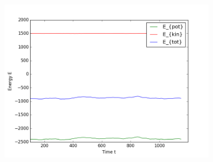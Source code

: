 \begin{figure}[ht]
\begin{subfigure}{0.3\textwidth}
\includegraphics[width=\textwidth]{fig/avEnergies_T1d0_F20d0_M100.png}
\end{subfigure}
\end{figure}

